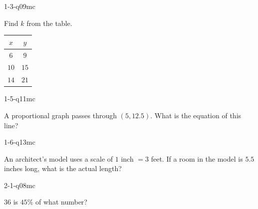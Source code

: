 
\begin{practiceQuestion}{1-3-q09}{mc}
\begin{questionText}
Find $k$ from the table.

\begin{center}
\begin{tabular}{|c|c|}
\hline $x$ & $y$ \\ \hline $6$ & $9$ \\ $10$ & $15$ \\ $14$ & $21$ \\ \hline
\end{tabular}
\end{center}
\end{questionText}
\end{practiceQuestion}

\begin{practiceQuestion}{1-5-q11}{mc}
\begin{questionText}
A proportional graph passes through $(5, 12.5)$. What is the equation of this line?
\end{questionText}
\end{practiceQuestion}

\begin{practiceQuestion}{1-6-q13}{mc}
\begin{questionText}
An architect's model uses a scale of $1$ inch $= 3$ feet. If a room in the model is $5.5$ inches long, what is the actual length?
\end{questionText}
\end{practiceQuestion}

\begin{practiceQuestion}{2-1-q08}{mc}
\begin{questionText}
$36$ is $45\%$ of what number?
\end{questionText}
\end{practiceQuestion}

